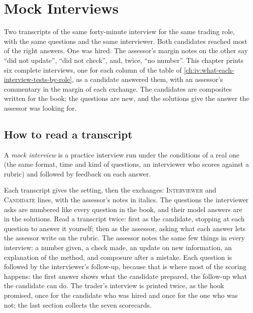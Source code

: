 \chapter{Mock Interviews}\label{ch:iv:mock-interviews}

Two transcripts of the same forty-minute interview for the same trading role, with the same questions and the same interviewer.
Both candidates reached most of the right answers. One was hired. The assessor's margin notes on the other say ``did not update'',
``did not check'', and, twice, ``no number''. This chapter prints six complete interviews, one for each column of the table of
\cref{ch:iv:what-each-interview-tests-by-role}, as a candidate answered them, with an assessor's commentary in the margin of
each exchange. The candidates are composites written for the book; the questions are new, and the solutions give the answer the
assessor was looking for.

\section{How to read a transcript}

\begin{definition}\label{def:iv:mock-interviews:mock}
A \emph{mock interview} is a practice interview run under the conditions of a real one (the same format, time and kind of
questions, an interviewer who scores against a rubric) and followed by feedback on each answer.
\end{definition}

Each transcript gives the setting, then the exchanges: \textsc{Interviewer} and \textsc{Candidate} lines, with the assessor's
notes in italics. The questions the interviewer asks are numbered like every question in the book, and their model answers are in
the solutions. Read a transcript twice: first as the candidate, stopping at each question to answer it yourself; then as the
assessor, asking what each answer lets the assessor write on the rubric. The assessor notes the same few things in every
interview: a number given, a check made, an update on new information, an explanation of the method, and composure after a mistake.
Each question is followed by the interviewer's follow-up, because that is where most of the scoring happens: the first answer shows
what the candidate prepared, the follow-up what the candidate can do. The trader's interview is printed twice, as the hook promised,
once for the candidate who was hired and once for the one who was not; the last section collects the seven scorecards.

